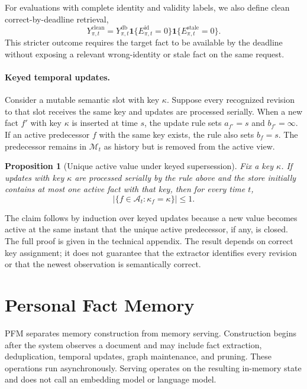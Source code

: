 \documentclass[letterpaper]{article} %
\newtheorem{proposition}{Proposition}
\begin{document}
For evaluations with complete identity and validity labels, we also define clean correct-by-deadline retrieval,
\begin{equation}
Y^{\mathrm{clean}}_{\pi,t}=Y^{\mathrm{db}}_{\pi,t}\mathbf{1}\{E^{\mathrm{id}}_{\pi,t}=0\}\mathbf{1}\{E^{\mathrm{stale}}_{\pi,t}=0\}.
\label{eq:clean_deadline}
\end{equation}
This stricter outcome requires the target fact to be available by the deadline without exposing a relevant wrong-identity or stale fact on the same request.

\paragraph{Keyed temporal updates.} Consider a mutable semantic slot with key $\kappa$. Suppose every recognized revision to that slot receives the same key and updates are processed serially. When a new fact $f'$ with key $\kappa$ is inserted at time $s$, the update rule sets $a_{f'}=s$ and $b_{f'}=\infty$. If an active predecessor $f$ with the same key exists, the rule also sets $b_f=s$. The predecessor remains in $\mathcal{M}_t$ as history but is removed from the active view.

\begin{proposition}[Unique active value under keyed supersession]
\label{prop:unique_active_value}
Fix a key $\kappa$. If updates with key $\kappa$ are processed serially by the rule above and the store initially contains at most one active fact with that key, then for every time $t$,
\begin{equation}
\left|\{f\in\mathcal{A}_t:\kappa_f=\kappa\}\right|\le 1.
\end{equation}
\end{proposition}

The claim follows by induction over keyed updates because a new value becomes active at the same instant that the unique active predecessor, if any, is closed. The full proof is given in the technical appendix. The result depends on correct key assignment; it does not guarantee that the extractor identifies every revision or that the newest observation is semantically correct.

\section{Personal Fact Memory}

PFM separates memory construction from memory serving. Construction begins after the system observes a document and may include fact extraction, deduplication, temporal updates, graph maintenance, and pruning. These operations run asynchronously. Serving operates on the resulting in-memory state and does not call an embedding model or language model.
\end{document}
